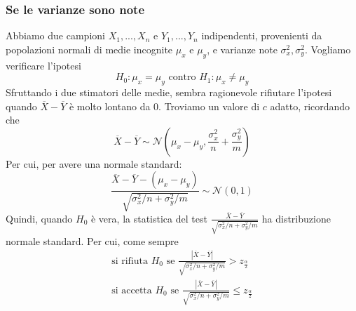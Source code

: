 \documentclass[11pt]{article}
\begin{document}
\subsubsection{Se le varianze sono note}
Abbiamo due campioni $X_1,...,X_n$ e $Y_1,...,Y_n$ indipendenti, provenienti da popolazioni normali di medie incognite $\mu_x$ e $\mu_y$, e varianze note $\sigma_x^2, \sigma_y^2$. Vogliamo verificare l'ipotesi 
\begin{displaymath}
    H_0:\mu_x = \mu_y \mbox{  contro  }H_1:\mu_x\neq\mu_y
\end{displaymath} 
Sfruttando i due stimatori delle medie, sembra ragionevole rifiutare l'ipotesi quando $\overline{X}-\overline{Y}$ è molto lontano da 0. Troviamo un valore di $c$ adatto, ricordando che
\begin{displaymath}
    \overline{X}-\overline{Y} \sim \mathcal{N}\left(\mu_x-\mu_y , \frac{\sigma_x^2}{n}+\frac{\sigma_y^2}{m}\right)
\end{displaymath} 
Per cui, per avere una normale standard:
\begin{displaymath}
    \frac{\overline{X}- \overline{Y} -(\mu_x-\mu_y)}{\sqrt{\sigma_x^2/n+\sigma_y^2/m}} \sim \mathcal{N}(0,1)
\end{displaymath}
Quindi, quando $H_0$ è vera, la statistica del test $\frac{\overline{X}- \overline{Y}}{\sqrt{\sigma_x^2/n+\sigma_y^2/m}}$ ha distribuzione normale standard.
Per cui, come sempre
\begin{gather*}
    \mbox{si rifiuta }H_0\mbox{ se }\frac{|\overline{X}- \overline{Y}|}{\sqrt{\sigma_x^2/n+\sigma_y^2/m}} > z_{\frac{\alpha}{2}}\\
    \mbox{si accetta }H_0\mbox{ se }\frac{|\overline{X}- \overline{Y}|}{\sqrt{\sigma_x^2/n+\sigma_y^2/m}} \le z_{\frac{\alpha}{2}}
\end{gather*}
\end{document}
